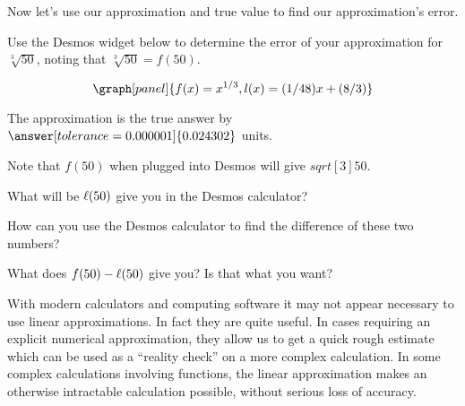\documentclass[handout,nooutcomes]{ximera}
\begin{document}
\begin{example}
\begin{explanation}
Now let's use our approximation and true value to find our approximation's error.


Use the Desmos widget below to determine the error of your approximation for $\sqrt[3]{50}$, noting that $\sqrt[3]{50} = f(50)$.

\[
\graph[panel]{f(x) = x^{1/3}, l(x) = (1/48) x + (8/3)}
\]

\begin{question}
The approximation is  the true 
answer by $\answer[tolerance=0.000001]{0.024302}$ units.

\begin{hint}
Note that $f(50)$ when plugged into Desmos will give $
sqrt[3]{50}$.
\end{hint}
\begin{hint}
What will be $\ell(50)$ give you in the Desmos calculator?
\end{hint}
\begin{hint}
How can you use the Desmos calculator to find the difference of these two numbers?
\end{hint}
\begin{hint}
What does $f(50)-\ell(50)$ give you? Is that what you want?
\end{hint}
\end{question}
\end{explanation}
\end{example}

With modern calculators and computing software it may not appear
necessary to use linear approximations. In fact they are quite
useful. In cases requiring an explicit numerical approximation, they
allow us to get a quick rough estimate which can be used as a
``reality check'' on a more complex calculation. In some complex
calculations involving functions, the linear approximation makes an
otherwise intractable calculation possible, without serious loss of
accuracy.
\end{document}
